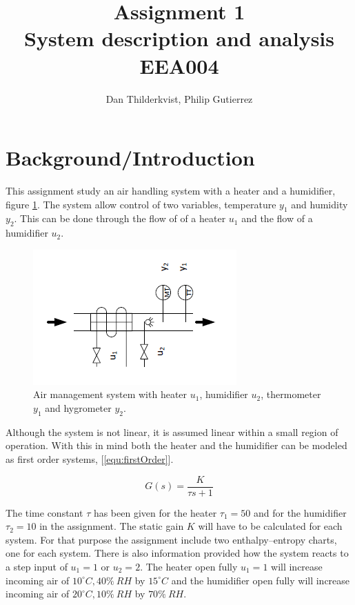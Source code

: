 \documentclass[a4paper, titlepage]{article}
\title{Assignment 1\\
System description and analysis\\
\large EEA004}
\author{Dan Thilderkvist, Philip Gutierrez}
\begin{document}
\maketitle

\section{Background/Introduction}
This assignment study an air handling system with a heater and a humidifier, figure \ref{fig:airSystem}.
The system allow control of two variables, temperature $y_1$ and humidity $y_2$.
This can be done through the flow of of a heater $u_1$ and the flow of a humidifier $u_2$.

\begin{figure}[h!]
\center
\includegraphics[scale=1]{../figures/heaterHumidifier.png}
\caption{Air management system with heater $u_1$, humidifier $u_2$, thermometer $y_1$ and hygrometer $y_2$.}
\label{fig:airSystem}
\end{figure}

Although the system is not linear, it is assumed linear within a small region of operation.
With this in mind both the heater and the humidifier can be modeled as first order systems, [\ref{equ:firstOrder}].

\begin{equation}
G(s) = \frac{K}{\tau s + 1}
\label{equ:firstOrder}
\end{equation}

The time constant $\tau$ has been given for the heater $\tau_1=50$ and for the humidifier $\tau_2=10$ in the assignment.
The static gain $K$ will have to be calculated for each system.
For that purpose the assignment include two enthalpy–entropy charts, one for each system.
There is also information provided how the system reacts to a step input of $u_1 = 1$ or $u_2 = 2$.
The heater open fully $u_1 = 1$ will increase incoming air of $10^\circ C, 40\% \: RH$ by $15^\circ C$ and the humidifier open fully will increase incoming air of $20^\circ C, 10\% \: RH$ by $70\% \: RH$.
\end{document}
